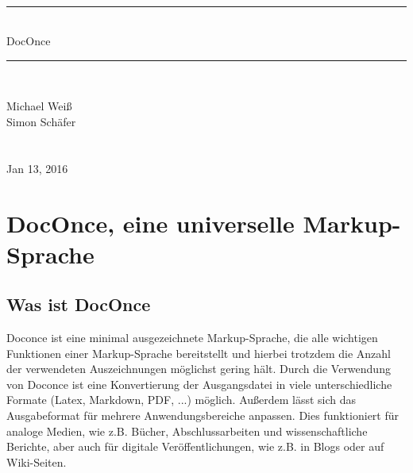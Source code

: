 \documentclass[%
oneside,                 %
final,                   %
chapterprefix=true,      %
open=right,              %
10pt]{book}
\begin{document}






\thispagestyle{empty}
\hbox{\ \ }
\vfill
\begin{center}
{\huge{\bfseries{
\begin{spacing}{1.25}
{\rule{\linewidth}{0.5mm}} \\[0.4cm]
{DocOnce}
\\[0.4cm] {\rule{\linewidth}{0.5mm}} \\[1.5cm]
\end{spacing}
}}}


\vspace{0.5cm}

{\Large\textsf{Michael Weiß${}^{}$}}\\ [3mm]

{\Large\textsf{Simon Schäfer${}^{}$}}\\ [3mm]

\ \\ [2mm]


\ \\ [10mm]
{\large\textsf{Jan 13, 2016}}

\end{center}
\vfill
\clearpage

\tableofcontents


\vspace{1cm} %




\chapter{DocOnce, eine universelle Markup-Sprache}
\section{Was ist DocOnce}
Doconce ist eine minimal ausgezeichnete Markup-Sprache, die alle wichtigen Funktionen einer Markup-Sprache bereitstellt und hierbei trotzdem die Anzahl der verwendeten Auszeichnungen möglichst gering hält. Durch die Verwendung von Doconce ist eine Konvertierung der Ausgangsdatei in viele unterschiedliche Formate (Latex, Markdown, PDF, ...) möglich. Außerdem lässt sich das Ausgabeformat für mehrere Anwendungsbereiche anpassen. Dies funktioniert für analoge Medien, wie z.B. Bücher, Abschlussarbeiten und wissenschaftliche Berichte, aber auch für digitale Veröffentlichungen, wie z.B. in Blogs oder auf Wiki-Seiten.
\end{document}
